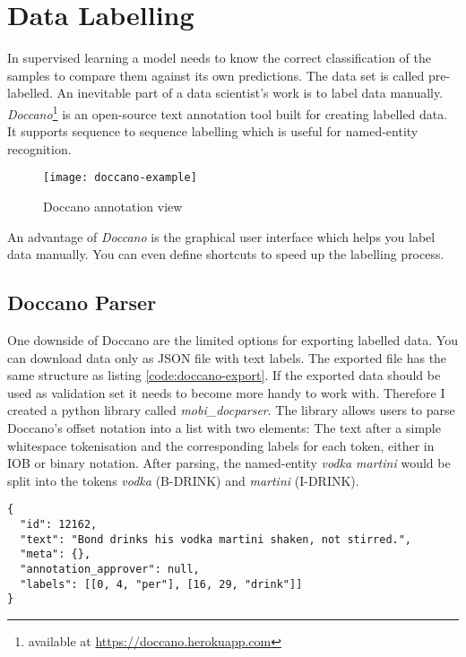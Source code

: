 \section{Data Labelling}

In supervised learning a model needs to know the correct classification of the samples to compare them against its own predictions. The data set is called pre-labelled. An inevitable part of a data scientist's work is to label data manually. \emph{Doccano}\footnote{available at \url{https://doccano.herokuapp.com}} is an open-source text annotation tool built for creating labelled data. It supports sequence to sequence labelling which is useful for named-entity recognition.

\begin{figure}[!ht]
    \centering
    \texttt{[image: doccano-example]}
    \caption{Doccano annotation view}
    \label{fig:doccano-example}
\end{figure}

An advantage of \emph{Doccano} is the graphical user interface which helps you label data manually. You can even define shortcuts to speed up the labelling process.

\subsection{Doccano Parser}

One downside of Doccano are the limited options for exporting labelled data. You can download data only as JSON file with text labels. The exported file has the same structure as listing \ref{code:doccano-export}. If the exported data should be used as validation set it needs to become more handy to work with. Therefore I created a python library called \emph{mobi\_docparser}. The library allows users to parse Doccano's offset notation into a list with two elements: The text after a simple whitespace tokenisation and the corresponding labels for each token, either in IOB or binary notation. After parsing, the named-entity \emph{vodka martini} would be split into the tokens \emph{vodka} (B-DRINK) and \emph{martini} (I-DRINK).

\begin{lstlisting}[label={code:doccano-export}, caption=Sample export from Doccano as JSON (text labels)]
{
  "id": 12162,
  "text": "Bond drinks his vodka martini shaken, not stirred.",
  "meta": {},
  "annotation_approver": null,
  "labels": [[0, 4, "per"], [16, 29, "drink"]]
}
\end{lstlisting}


